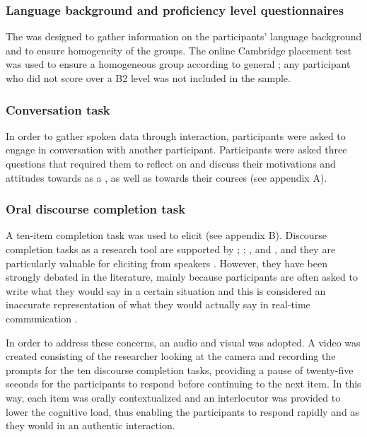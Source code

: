 \documentclass[output=paper]{langsci/langscibook}
\begin{document}
\subsubsection{Language background and proficiency level questionnaires}

The  was designed to gather information on the participants’ language background and  to ensure homogeneity of the groups. The online Cambridge placement test was used to ensure a homogeneous group according to general  ; any participant who did not score over a B2 level was not included in the sample.


\subsubsection{Conversation task}

In order to gather spoken data through interaction, participants were asked to engage in conversation with another participant. Participants were asked three questions that required them to reflect on and discuss their motivations and attitudes towards  as a , as well as towards their  courses (see appendix A).


\subsubsection{Oral discourse completion task}

A ten-item  completion task was used to elicit  (see appendix B). Discourse completion tasks as a research tool are supported by \cite{Usó-JuanMartínez-Flor2014}; \cite{ParvareshTavakoli2009}; \cite{KasperRose2002}, and \citet{Hinkel1997}, and they are particularly valuable for eliciting  from  speakers \citep{Roever2009}. However, they have been strongly debated in the literature, mainly because participants are often asked to write what they would say in a certain situation and this is considered an inaccurate representation of what they would actually say in real-time communication \citep{Bardovi-Harlig2015}. 

In order to address these concerns, an audio and visual  was adopted. A video was created consisting of the researcher looking at the camera and recording the prompts for the ten discourse completion tasks, providing a pause of twenty-five seconds for the participants to respond before continuing to the next item. In this way, each item was orally contextualized and an interlocutor was provided to lower the cognitive load, thus enabling the participants to respond rapidly and as they would in an authentic interaction.
\end{document}
